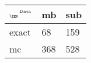 \begin{tabular}{lll}
    \toprule
    $_{\text{\tiny{\ggn}}}$$^{\text{\tiny{Data}}}$ & mb & sub \\
    \midrule
    exact & 68
              & 159 \\
    mc   & 368
              & 528 \\
    \bottomrule
\end{tabular}